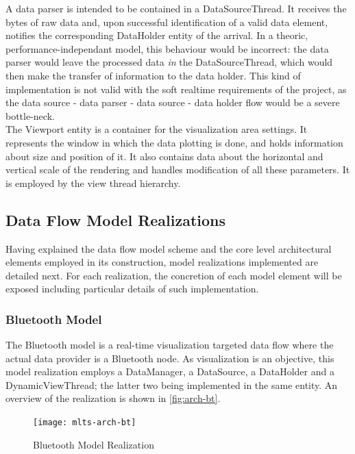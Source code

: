 		A data parser is intended to be contained in a DataSourceThread. It receives the bytes of raw data and, upon successful identification of a valid data element, notifies the corresponding DataHolder entity of the arrival. In a theoric, performance-independant model, this behaviour would be incorrect: the data parser would leave the processed data \emph{in} the DataSourceThread, which would then make the transfer of information to the data holder. This kind of implementation is not valid with the soft realtime requirements of the project, as the data source - data parser - data source - data holder flow would be a severe bottle-neck.\\

		The Viewport entity is a container for the visualization area settings. It represents the window in which the data plotting is done, and holds information about size and position of it. It also contains data about the horizontal and vertical scale of the rendering and handles modification of all these parameters. It is employed by the view thread hierarchy.
		
		\subsection{Data Flow Model Realizations}

		Having explained the data flow model scheme and the core level architectural elements employed in its construction, model realizations implemented are detailed next. For each realization, the concretion of each model element will be exposed including particular details of such implementation.

		\subsubsection{Bluetooth Model}
			The Bluetooth model is a real-time visualization targeted data flow where the actual data provider is a Bluetooth node. As visualization is an objective, this model realization employs a DataManager, a DataSource, a DataHolder and a DynamicViewThread; the latter two being implemented in the same entity. An overview of the realization is shown in \autoref{fig:arch-bt}.\\

			\begin{figure}[h]
			\centering
		    	\texttt{[image: mlts-arch-bt]}
	  		\caption{Bluetooth Model Realization}
			\label{fig:arch-bt}
			\end{figure}

